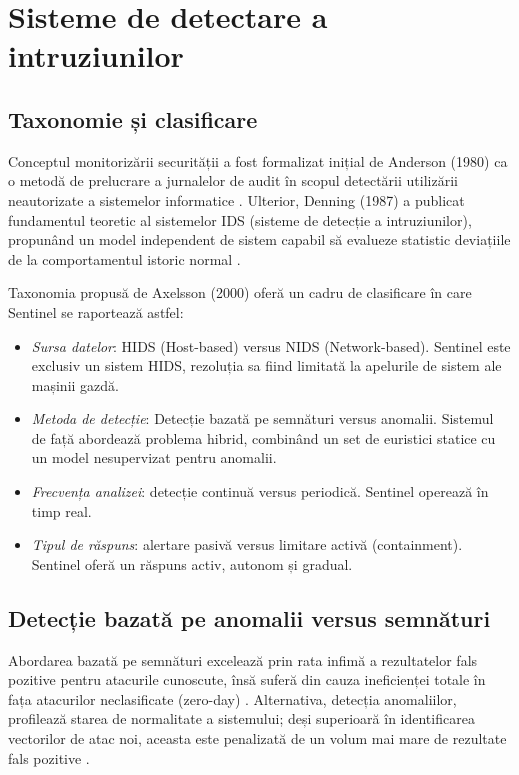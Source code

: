 \section{Sisteme de detectare a intruziunilor}
\label{sec:ids}

\subsection{Taxonomie și clasificare}
\label{subsec:ids_taxonomy}

\par Conceptul monitorizării securității a fost formalizat inițial de Anderson (1980) ca o metodă de prelucrare a jurnalelor de audit în scopul detectării utilizării neautorizate a sistemelor informatice \cite{Anderson1980}. Ulterior, Denning (1987) a publicat fundamentul teoretic al sistemelor IDS (sisteme de detecție a intruziunilor), propunând un model independent de sistem capabil să evalueze statistic deviațiile de la comportamentul istoric normal \cite{Denning1987}.

\par Taxonomia propusă de Axelsson (2000) \cite{Axelsson2000} oferă un cadru de clasificare în care Sentinel se raportează astfel:

\begin{itemize}
    \item \textit{Sursa datelor}: HIDS (Host-based) versus NIDS (Network-based). Sentinel este exclusiv un sistem HIDS, rezoluția sa fiind limitată la apelurile de sistem ale mașinii gazdă.
    \item \textit{Metoda de detecție}: Detecție bazată pe semnături versus anomalii. Sistemul de față abordează problema hibrid, combinând un set de euristici statice cu un model nesupervizat pentru anomalii.
    \item \textit{Frecvența analizei}: detecție continuă versus periodică. Sentinel operează în timp real.
    \item \textit{Tipul de răspuns}: alertare pasivă versus limitare activă (containment). Sentinel oferă un răspuns activ, autonom și gradual.
\end{itemize}


\subsection{Detecție bazată pe anomalii versus semnături}
\label{subsec:anomaly_vs_signature}

\par Abordarea bazată pe semnături excelează prin rata infimă a rezultatelor fals pozitive pentru atacurile cunoscute, însă suferă din cauza ineficienței totale în fața atacurilor neclasificate (zero-day) \cite{GarciaTe2009}. Alternativa, detecția anomaliilor, profilează starea de normalitate a sistemului; deși superioară în identificarea vectorilor de atac noi, aceasta este penalizată de un volum mai mare de rezultate fals pozitive \cite{Chandola2009}.

